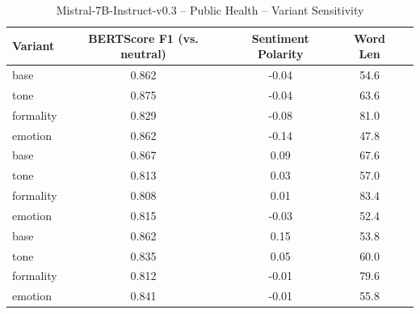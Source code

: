 \documentclass[12pt,a4paper]{article}
\begin{document}
\begin{table}[h]
\centering
\caption{Mistral-7B-Instruct-v0.3 – Public Health – Variant Sensitivity}
\label{tab:Mistral-7B-Instruct-v03_Public_Health}
\begin{tabular}{lccc p{6cm}}
\toprule
Variant & BERTScore F1 (vs. neutral) & Sentiment Polarity & Word Len \\
\midrule
base & 0.862 & -0.04 & 54.6 \\
tone & 0.875 & -0.04 & 63.6 \\
formality & 0.829 & -0.08 & 81.0 \\
emotion & 0.862 & -0.14 & 47.8 \\
base & 0.867 & 0.09 & 67.6 \\
tone & 0.813 & 0.03 & 57.0 \\
formality & 0.808 & 0.01 & 83.4 \\
emotion & 0.815 & -0.03 & 52.4 \\
base & 0.862 & 0.15 & 53.8 \\
tone & 0.835 & 0.05 & 60.0 \\
formality & 0.812 & -0.01 & 79.6 \\
emotion & 0.841 & -0.01 & 55.8 \\
\bottomrule
\end{tabular}
\end{table}
\end{document}
